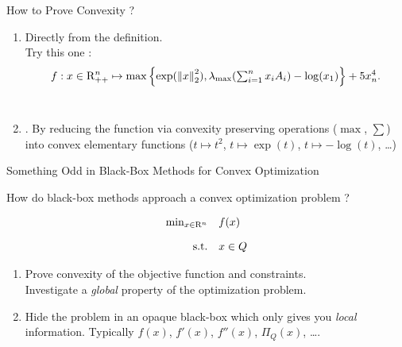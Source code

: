 \documentclass[9pt]{beamer}
\begin{document}
\begin{frame}{How to Prove Convexity ?}

  \begin{enumerate}
  \item Directly from the definition. \\
    Try this one :
    \[
      f : x \in \mathrm{R}^n_{++} \mapsto \max \left\{\exp(\left\|x\right\|^2_2), \lambda_{\max}(\textstyle\sum_{i=1}^n x_i A_i) - \log(x_1)\right\} + 5 x_n^4.
    \]
    \\[2em]
  \item<2-> . By reducing the function via convexity preserving operations ($\max$, $\sum$) into convex elementary functions ($t\mapsto t^2$, $t\mapsto\exp(t)$, $t \mapsto -\log(t)$, \dots)
  \end{enumerate}
  
  \vfill

\end{frame}


\begin{frame}{Something Odd in Black-Box Methods for Convex Optimization}

  How do black-box methods approach a convex optimization problem ?

  \[
    \begin{array}{rl}
      \min_{x\in\mathrm{R}^n} & f(x) \\[1em]
      \mathrm{s.t.} & x\in Q
    \end{array}
  \]

  \vfill
  
  \begin{enumerate}
  \item Prove convexity of the objective function and constraints. \\
    Investigate a \emph{global} property of the optimization problem. \\[2em]

  \item<2-> Hide the problem in an opaque black-box which only gives you \emph{local} information.
    Typically $f(x)$, $f'(x)$, $f''(x)$, $\Pi_Q(x)$, \dots.
  \end{enumerate}
  
\end{frame}
\end{document}
